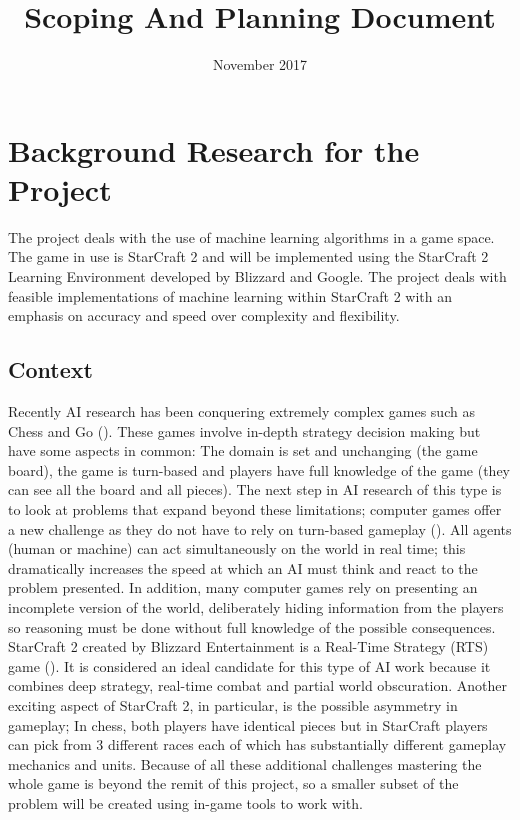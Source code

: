 \documentclass[12pt]{article}
\title{Scoping And Planning Document}
\date{November 2017}
\begin{document}


\maketitle

\section{Background Research for the Project}

The project deals with the use of machine learning algorithms in a game space.
The game in use is StarCraft 2 and will be implemented using the StarCraft 2
Learning Environment developed by Blizzard and Google.
The project deals with feasible implementations of machine learning within
StarCraft 2 with an emphasis on accuracy and speed over complexity and
flexibility.

\subsection{Context}
Recently AI research has been conquering extremely complex games such as
Chess and Go (\cite{deepmind}). These games involve in-depth strategy decision
making but have some aspects in common: The domain is set and unchanging
(the game board), the game is turn-based and players have full knowledge of
the game (they can see all the board and all pieces).
The next step in AI research of this type is to look at problems that expand
beyond these limitations; computer games offer a new challenge as they
do not have to rely on turn-based gameplay (\textcite{vinyals2017starcraft}).
All agents (human or machine) can act simultaneously on the world in real time;
this dramatically increases
the speed at which an AI must think and react to the problem presented.
In addition, many computer games rely on presenting an incomplete version
of the world, deliberately hiding information from the players so reasoning
must be done without full knowledge of the possible consequences.
StarCraft 2 created by Blizzard Entertainment is a Real-Time Strategy (RTS)
game (\cite{starcraft2}). It is considered an ideal candidate for this type of
AI work because it combines deep strategy, real-time combat and partial
world obscuration. Another exciting aspect of StarCraft 2, in particular,
is the possible asymmetry in gameplay; In chess, both players have
identical pieces but in StarCraft players can pick from 3 different
races each of which has substantially different gameplay mechanics and units.
Because of all these additional challenges mastering the whole game is
beyond the remit of this project, so a smaller subset of the problem
will be created using in-game tools to work with.
\end{document}
